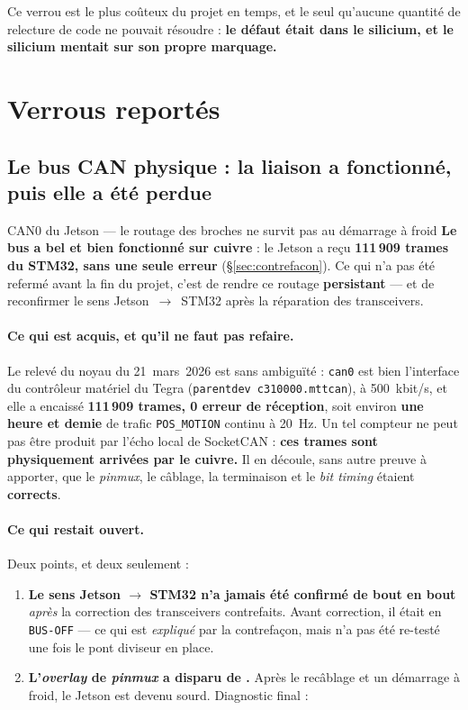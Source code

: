\documentclass[11pt,a4paper]{article}
\begin{document}
\noindent
Ce verrou est le plus coûteux du projet en temps, et le seul qu'aucune quantité de relecture
de code ne pouvait résoudre : \textbf{le défaut était dans le silicium, et le silicium
mentait sur son propre marquage.}

\newpage
\section{Verrous reportés}

\subsection{Le bus CAN physique : la liaison a fonctionné, puis elle a été perdue}
\label{sec:can}

\begin{verroureporte}{CAN0 du Jetson — le routage des broches ne survit pas au démarrage à froid}
\textbf{Le bus a bel et bien fonctionné sur cuivre} : le Jetson a reçu \textbf{111\,909
trames du STM32, sans une seule erreur} (§\ref{sec:contrefacon}). Ce qui n'a pas été refermé
avant la fin du projet, c'est de rendre ce routage \textbf{persistant} — et de reconfirmer le
sens Jetson~$\rightarrow$~STM32 après la réparation des transceivers.
\end{verroureporte}

\paragraph{Ce qui est acquis, et qu'il ne faut pas refaire.} Le relevé du noyau du
21~mars~2026 est sans ambiguïté : \texttt{can0} est bien l'interface du contrôleur matériel
du Tegra (\texttt{parentdev c310000.mttcan}), à 500~kbit/s, et elle a encaissé
\textbf{111\,909 trames, 0 erreur de réception}, soit environ \textbf{une heure et demie} de
trafic \texttt{POS\_MOTION} continu à 20~Hz. Un tel compteur ne peut pas être produit par
l'écho local de SocketCAN : \textbf{ces trames sont physiquement arrivées par le cuivre.} Il
en découle, sans autre preuve à apporter, que le \emph{pinmux}, le câblage, la terminaison et
le \emph{bit timing} étaient \textbf{corrects}.

\paragraph{Ce qui restait ouvert.} Deux points, et deux seulement :
\begin{enumerate}
  \item \textbf{Le sens Jetson $\rightarrow$ STM32 n'a jamais été confirmé de bout en bout}
        \emph{après} la correction des transceivers contrefaits. Avant correction, il était
        en \texttt{BUS-OFF} — ce qui est \emph{expliqué} par la contrefaçon, mais n'a pas été
        re-testé une fois le pont diviseur en place.
  \item \textbf{L'\emph{overlay} de \emph{pinmux} a disparu de .} Après le
        recâblage et un démarrage à froid, le Jetson est devenu sourd. Diagnostic final :
\end{enumerate}
\end{document}
